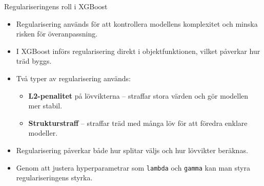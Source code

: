 \documentclass[10pt,english]{beamer}
\begin{document}
\begin{frame}{Regulariseringens roll i XGBoost}
  \begin{itemize}
    \item Regularisering används för att kontrollera modellens komplexitet och minska risken för överanpassning.
    \item I XGBoost införs regularisering direkt i objektfunktionen, vilket påverkar hur träd byggs.
    \item Två typer av regularisering används:
    \begin{itemize}
      \item \textbf{L2-penalitet} på lövvikterna – straffar stora värden och gör modellen mer stabil.
      \item \textbf{Strukturstraff} – straffar träd med många löv för att föredra enklare modeller.
    \end{itemize}
    \item Regularisering påverkar både hur splitar väljs och hur lövvikter beräknas.
    \item Genom att justera hyperparametrar som \texttt{lambda} och \texttt{gamma} kan man styra regulariseringens styrka.
  \end{itemize}
\end{frame}
\end{document}
